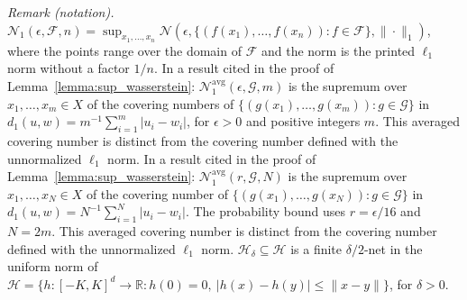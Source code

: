 \noindent\textit{Remark (notation).} $\mathcal{N}_1(\epsilon,\mathcal{F},n)=\sup_{x_1,\ldots,x_n}\mathcal{N}(\epsilon,\{(f(x_1),\ldots,f(x_n)):f\in\mathcal{F}\},\|\cdot\|_1)$, where the points range over the domain of $\mathcal{F}$ and the norm is the printed $\ell_1$ norm without a factor $1/n$. In a result cited in the proof of Lemma~\ref{lemma:sup_wasserstein}: $\mathcal N_1^{\mathrm{avg}}(\epsilon,\mathcal G,m)$ is the supremum over $x_1,\ldots,x_m\in X$ of the covering numbers of $\{(g(x_1),\ldots,g(x_m)):g\in\mathcal G\}$ in $d_1(u,w)=m^{-1}\sum_{i=1}^m|u_i-w_i|$, for $\epsilon>0$ and positive integers $m$. This averaged covering number is distinct from the covering number defined with the unnormalized $\ell_1$ norm. In a result cited in the proof of Lemma~\ref{lemma:sup_wasserstein}: $\mathcal N_1^{\mathrm{avg}}(r,\mathcal G,N)$ is the supremum over $x_1,\ldots,x_N\in X$ of the covering number of $\{(g(x_1),\ldots,g(x_N)):g\in\mathcal G\}$ in $d_1(u,w)=N^{-1}\sum_{i=1}^N|u_i-w_i|$. The probability bound uses $r=\epsilon/16$ and $N=2m$. This averaged covering number is distinct from the covering number defined with the unnormalized $\ell_1$ norm. $\mathcal H_\delta\subseteq\mathcal H$ is a finite $\delta/2$-net in the uniform norm of $\mathcal H=\{h:[-K,K]^d\rightarrow\mathbb R:h(0)=0,\ |h(x)-h(y)|\leqslant\|x-y\|\}$, for $\delta>0$.

